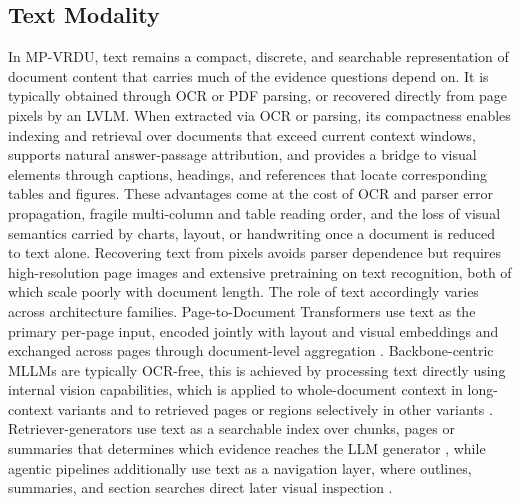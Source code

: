 \documentclass[11pt]{article}
\begin{document}
\subsection{Text Modality}
In MP-VRDU, text remains a compact, discrete, and searchable representation of document content that carries much of the evidence questions depend on. It is typically obtained through OCR or PDF parsing, or recovered directly from page pixels by an LVLM. When extracted via OCR or parsing, its compactness enables indexing and retrieval over documents that exceed current context windows, supports natural answer-passage attribution, and provides a bridge to visual elements through captions, headings, and references that locate corresponding tables and figures. These advantages come at the cost of OCR and parser error propagation, fragile multi-column and table reading order, and the loss of visual semantics carried by charts, layout, or handwriting once a document is reduced to text alone. Recovering text from pixels avoids parser dependence but requires high-resolution page images and extensive pretraining on text recognition, both of which scale poorly with document length. The role of text accordingly varies across architecture families. Page-to-Document Transformers use text as the primary per-page input, encoded jointly with layout and visual embeddings and exchanged across pages through document-level aggregation \cite{tito2023hierarchical, blau2024gram, borchmann2025arctic}. Backbone-centric MLLMs are typically OCR-free, this is achieved by processing text directly using internal vision capabilities, which is applied to whole-document context in long-context variants \cite{hu2025mplug, yu2024texthawk2} and to retrieved pages or regions selectively in other variants \cite{zheng2026doc, jain2025simpledoc}. Retriever-generators use text as a searchable index over chunks, pages or summaries that determines which evidence reaches the LLM generator \cite{zhang2024cream, shin2025multidocfusion}, while agentic pipelines additionally use text as a navigation layer, where outlines, summaries, and section searches direct later visual inspection \cite{han2025mdocagent, sun2025docagent, wang2025vidorag}.

\end{document}
